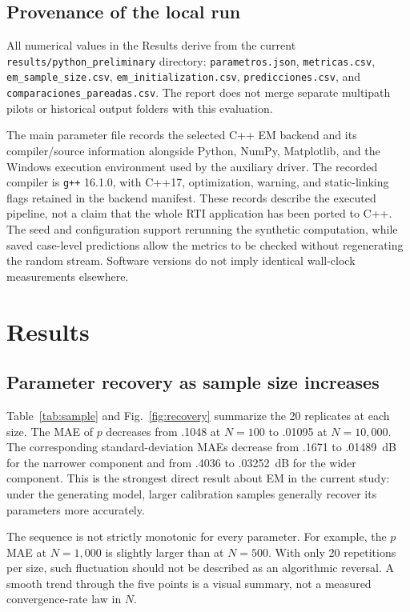 \documentclass[conference,letterpaper]{IEEEtran}
\begin{document}
\subsection{Provenance of the local run}
All numerical values in the Results derive from the current \texttt{results/python\_preliminary} directory: \texttt{parametros.json}, \texttt{metricas.csv}, \texttt{em\_sample\_size.csv}, \texttt{em\_initialization.csv}, \texttt{predicciones.csv}, and \texttt{comparaciones\_pareadas.csv}. The report does not merge separate multipath pilots or historical output folders with this evaluation.

The main parameter file records the selected C++ EM backend and its compiler/source information alongside Python, NumPy, Matplotlib, and the Windows execution environment used by the auxiliary driver. The recorded compiler is \texttt{g++} 16.1.0, with C++17, optimization, warning, and static-linking flags retained in the backend manifest. These records describe the executed pipeline, not a claim that the whole RTI application has been ported to C++. The seed and configuration support rerunning the synthetic computation, while saved case-level predictions allow the metrics to be checked without regenerating the random stream. Software versions do not imply identical wall-clock measurements elsewhere.

\section{Results}
\subsection{Parameter recovery as sample size increases}
Table~\ref{tab:sample} and Fig.~\ref{fig:recovery} summarize the 20 replicates at each size. The MAE of $p$ decreases from .1048 at $N=100$ to .01095 at $N=10{,}000$. The corresponding standard-deviation MAEs decrease from .1671 to .01489~dB for the narrower component and from .4036 to .03252~dB for the wider component. This is the strongest direct result about EM in the current study: under the generating model, larger calibration samples generally recover its parameters more accurately.

The sequence is not strictly monotonic for every parameter. For example, the $p$ MAE at $N=1{,}000$ is slightly larger than at $N=500$. With only 20 repetitions per size, such fluctuation should not be described as an algorithmic reversal. A smooth trend through the five points is a visual summary, not a measured convergence-rate law in $N$.
\end{document}

